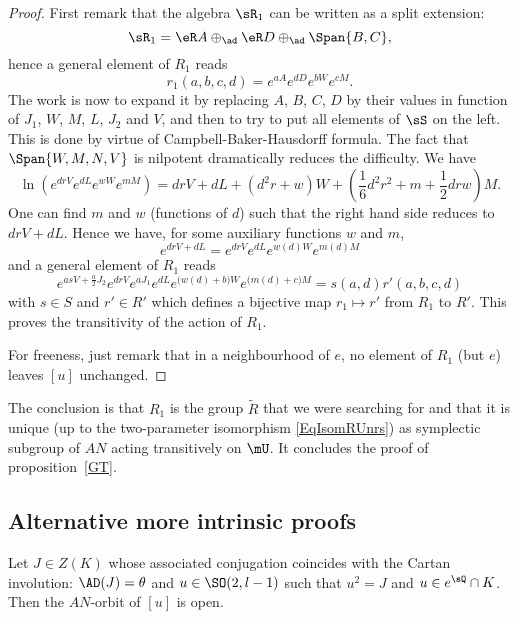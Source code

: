 \begin{proof}

First remark that the algebra $\sR_1$ can be written as a split extension:
\[
  \sR_1=\eR A\oplus_{\ad} \eR D\oplus_{\ad}\Span\{ B,C \},
\]
hence a general element of $R_1$ reads
 \begin{equation}
r_1(a,b,c,d)= e^{aA} e^{dD} e^{bW} e^{cM}.
\end{equation}
The work is now to expand it by replacing $A$, $B$, $C$, $D$ by their values in function of $J_1$, $W$, $M$, $L$, $J_2$ and $V$, and then to try to put all elements of $\sS$ on the left. This is done by virtue of Campbell-Baker-Hausdorff formula. The fact that $\Span\{ W,M,N,V \}$ is nilpotent dramatically reduces the difficulty. We have
\[
  \ln( e^{drV} e^{dL} e^{wW} e^{mM})= drV+dL+(d^{2}r+w)W+(\frac{1}{ 6 }d^{2}r^{2}+m+\frac{ 1 }{2}drw)M.
\]
One can find $m$ and $w$ (functions of $d$) such that the right hand side reduces to $drV+dL$. Hence we have, for some auxiliary functions $w$ and $m$,
\[
   e^{drV+dL}= e^{drV} e^{dL} e^{w(d)W} e^{m(d)M}
\]
and a general element of $R_1$ reads
\begin{equation}
 e^{asV+\frac{ a }{2}J_2} e^{drV} e^{aJ_1} e^{dL} e^{\big( w(d)+b \big)W} e^{\big( m(d)+c \big)M}=s(a,d)r'(a,b,c,d)
\end{equation}
with $s\in S$ and $r'\in R'$ which defines a bijective map $r_1\mapsto r'$ from $R_1$ to $R'$. This proves the transitivity of the action of $R_1$.

 For freeness, just remark that in a neighbourhood of $e$, no element of $R_1$ (but $e$) leaves $[u]$ unchanged.
\end{proof}

The conclusion is that $R_1$ is the group $\tilde{R}$ that we were searching for and that it is unique (up to the two-parameter isomorphism \eqref{EqIsomRUnrs}) as symplectic subgroup of $AN$ acting transitively on $\mU$. It concludes the proof of proposition~\ref{GT}.

\subsection{Alternative more intrinsic proofs}      \label{subSecAltreintr}

\begin{proposition}
Let $J\in Z(K)$ whose associated conjugation coincides with the Cartan involution: $\AD(J)=\theta$ and $u\in\SO(2,l-1)$ such that $u^2=J$ and $u\in e^{\sQ}\cap K$. Then the $AN$-orbit of $[u]$ is open.
\end{proposition}

